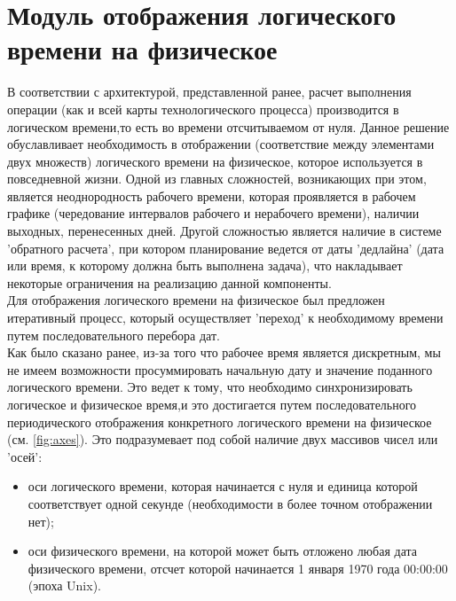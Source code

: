 \section{Модуль отображения логического времени на физическое}
\indent В соответствии с архитектурой, представленной ранее, расчет выполнения операции (как и всей карты технологического процесса) производится в логическом времени,то есть во времени отсчитываемом от нуля.
Данное решение обуславливает необходимость в отображении (соответствие между элементами двух множеств) логического времени на физическое, которое используется в повседневной жизни.
Одной из главных сложностей, возникающих при этом, является неоднородность рабочего времени, которая проявляется в рабочем графике (чередование интервалов рабочего и нерабочего времени), наличии выходных, перенесенных дней.
Другой сложностью является наличие в системе 'обратного расчета', при котором планирование ведется от даты 'дедлайна' (дата или время, к которому должна быть выполнена задача), что накладывает некоторые ограничения на реализацию данной компоненты.\\
\indent Для отображения логического времени на физическое был предложен итеративный процесс, который осуществляет 'переход' к необходимому времени путем последовательного перебора дат.\\
\indent Как было сказано ранее, из-за того что рабочее время является дискретным, мы не имеем возможности просуммировать начальную дату и значение поданного логического времени.
Это ведет к тому, что необходимо синхронизировать логическое и физическое время,и это достигается путем последовательного периодического отображения конкретного логического времени на физическое (см. \ref{fig:axes}).
Это подразумевает под собой наличие двух массивов чисел или 'осей':

\begin{itemize}
	\item оси логического времени, которая начинается с нуля и единица которой соответствует одной секунде (необходимости в более точном отображении нет);
	\item оси физического времени, на которой может быть отложено любая дата физического времени, отсчет которой начинается 1 января 1970 года 00:00:00 (эпоха Unix).
\end{itemize}

